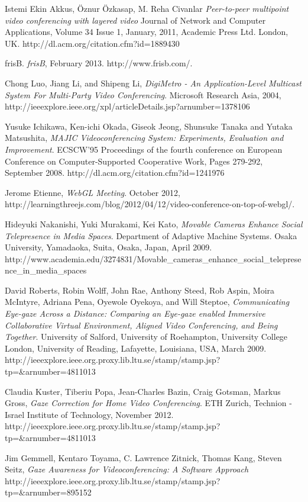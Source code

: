 \documentclass[12pt, titlepage]{article}
\begin{document}
\begin{thebibliography}{9}
Istemi Ekin Akkus, Öznur Özkasap, M. Reha Civanlar  
\emph{Peer-to-peer multipoint video conferencing with layered video}
Journal of Network and Computer Applications, Volume 34 Issue 1, January, 2011,
Academic Press Ltd. London, UK.
http://dl.acm.org/citation.cfm?id=1889430

 frisB. \emph{frisB}, February 2013. http://www.frisb.com/.

Chong Luo, Jiang Li, and Shipeng Li,
\emph{DigiMetro - An Application-Level Multicast System For Multi-Party Video Conferencing}.
Microsoft Research Asia,
2004,
http://ieeexplore.ieee.org/xpl/articleDetails.jsp?arnumber=1378106

Yusuke Ichikawa, Ken-ichi Okada, Giseok Jeong, Shunsuke Tanaka and Yutaka Matsushita,
\emph{MAJIC Videoconferencing System: Experiments, Evaluation and Improvement}.
ECSCW'95 Proceedings of the fourth conference on European Conference on Computer-Supported Cooperative Work, Pages 279-292, September 2008.
http://dl.acm.org/citation.cfm?id=1241976

Jerome Etienne, \emph{WebGL Meeting}.
October 2012,
http://learningthreejs.com/blog/2012/04/12/video-conference-on-top-of-webgl/.	

Hideyuki Nakanishi, Yuki Murakami, Kei Kato,
\emph{Movable Cameras Enhance Social Telepresence in Media Spaces}.
Department of Adaptive Machine Systems. Osaka University, Yamadaoka, Suita, Osaka, Japan, April 2009.
http://www.academia.edu/3274831/Movable\_cameras\_enhance\_social\_telepresence\_in\_media\_spaces

David Roberts, Robin Wolff, John Rae, Anthony Steed, Rob Aspin, Moira McIntyre, Adriana Pena, Oyewole Oyekoya, and Will Steptoe,
\emph{Communicating Eye-gaze Across a Distance: Comparing an Eye-gaze enabled Immersive Collaborative Virtual Environment, Aligned Video Conferencing, and Being Together}.
University of Salford, University of Roehampton, University College London, University of Reading, Lafayette, Louisiana, USA, March 2009.
http://ieeexplore.ieee.org.proxy.lib.ltu.se/stamp/stamp.jsp?tp=\&arnumber=4811013

Claudia Kuster, Tiberiu Popa, Jean-Charles Bazin, Craig Gotsman, Markus Gross,
\emph{Gaze Correction for Home Video Conferencing}.
ETH Zurich, Technion - Israel Institute of Technology, November 2012.
http://ieeexplore.ieee.org.proxy.lib.ltu.se/stamp/stamp.jsp?tp=\&arnumber=4811013

Jim Gemmell, Kentaro Toyama, C. Lawrence Zitnick, Thomas Kang, Steven Seitz,
\emph{Gaze Awareness for Videoconferencing: A Software Approach}
http://ieeexplore.ieee.org.proxy.lib.ltu.se/stamp/stamp.jsp?tp=\&arnumber=895152


\end{thebibliography}
\end{document}
